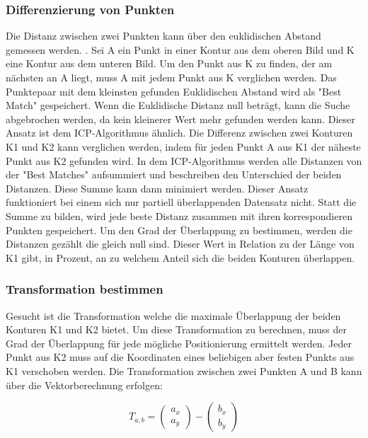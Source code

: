 \documentclass[../main.tex]{subfiles}
\begin{document}
\subsubsection{Differenzierung von Punkten}

Die Distanz zwischen zwei Punkten kann über den euklidischen Abstand gemessen werden.
\cite{Dokmanic.2015}. Sei A ein Punkt in einer Kontur aus dem oberen Bild und K eine 
Kontur aus dem unteren Bild.  
Um den Punkt aus K zu finden, der am nächsten an A liegt, muss A mit jedem Punkt aus 
K verglichen werden. Das Punktepaar mit dem kleinsten gefunden Euklidischen Abstand 
wird als "Best Match" gespeichert. Wenn die Euklidische Distanz null beträgt, kann 
die Suche abgebrochen werden, da kein kleinerer Wert mehr gefunden werden kann.
Dieser Ansatz ist dem ICP-Algorithmus ähnlich. Die Differenz zwischen zwei Konturen 
K1 und K2 kann verglichen werden, indem für jeden Punkt A aus K1 der näheste Punkt aus 
K2 gefunden wird. In dem ICP-Algorithmus werden alle Distanzen von der "Best Matches" 
aufsummiert und beschreiben den Unterschied der beiden Distanzen. Diese Summe kann dann 
minimiert werden. Dieser Ansatz funktioniert bei einem sich nur partiell
überlappenden Datensatz nicht. 
Statt die Summe zu bilden, wird jede beste Distanz zusammen mit ihren korrespondieren 
Punkten gespeichert. Um den Grad der Überlappung zu bestimmen, werden die Distanzen 
gezählt die gleich null sind. Dieser Wert in Relation zu der Länge von K1 gibt, 
in Prozent, an zu welchem Anteil sich die beiden Konturen überlappen.

\subsubsection*{Transformation bestimmen}

Gesucht ist die Transformation welche die maximale Überlappung der beiden 
Konturen K1 und K2 bietet. Um diese Transformation zu berechnen, muss der 
Grad der Überlappung für jede mögliche Positionierung ermittelt werden. Jeder
Punkt aus K2 muss auf die Koordinaten eines beliebigen aber festen Punkts aus K1 
verschoben werden.
Die Transformation zwischen zwei Punkten A und B kann über die Vektorberechnung erfolgen:

\begin{equation*}
    T_{a,b} = \begin{pmatrix}a_x\\a_y\end{pmatrix} - \begin{pmatrix}b_x\\b_y\end{pmatrix}
\end{equation*}
\end{document}
